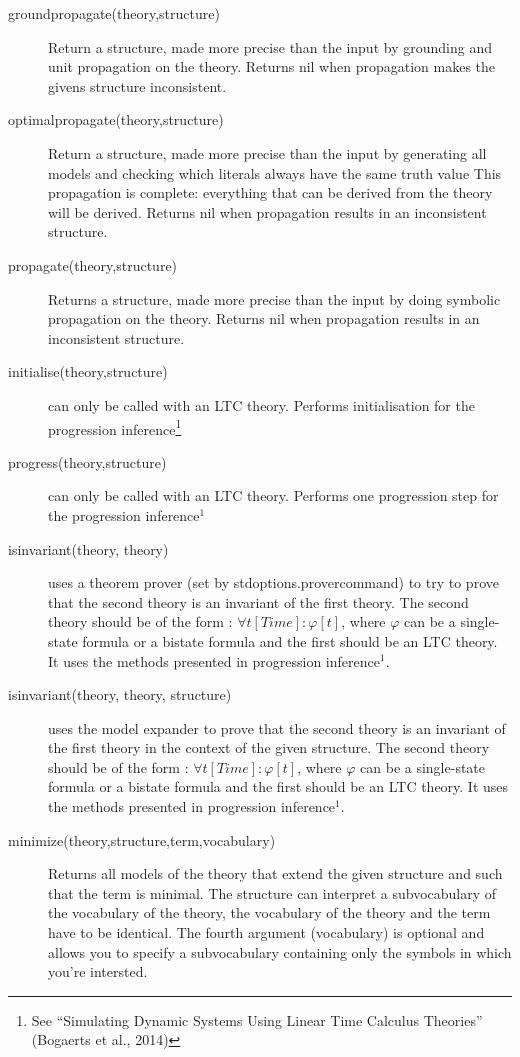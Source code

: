 \begin{description}
 	\item[groundpropagate(theory,structure)]
 		Return a structure, made more precise than the input by grounding and unit propagation on the theory.
		Returns nil when propagation makes the givens structure inconsistent.
	\item[optimalpropagate(theory,structure)]
 		Return a structure, made more precise than the input by generating all models and checking which literals always have the same truth value
 		This propagation is complete: everything that can be derived from the theory will be derived. 
 		Returns nil when propagation results in an inconsistent structure.
	\item[propagate(theory,structure)]
 		Returns a structure, made more precise than the input by doing symbolic propagation on the theory.
 		Returns nil when propagation results in an inconsistent structure.
 	\item[initialise(theory,structure)] can only be called with an LTC theory. Performs initialisation for the progression inference\footnote{See ``Simulating Dynamic Systems Using Linear Time Calculus Theories'' (Bogaerts et al., 2014)} 
 	\item[progress(theory,structure)] can only be called with an LTC theory. Performs one progression step for the progression inference$^1$ 
	\item[isinvariant(theory, theory)] uses a theorem prover (set by stdoptions.provercommand) to try to prove that the second theory is an invariant of the first theory. The second theory should be of the form : $\forall t[Time]:\varphi[t]$, where $\varphi$ can be a single-state formula or a bistate formula and the first should be an LTC theory. It uses the methods presented in progression inference$^1$.
	\item[isinvariant(theory, theory, structure)] uses the model expander to prove that the second theory is an invariant of the first theory in the context of the given structure. The second theory should be of the form : $\forall t[Time]:\varphi[t]$, where $\varphi$ can be a single-state formula or a bistate formula and the first should be an LTC theory. It uses the methods presented in progression inference$^1$.
	\item[minimize(theory,structure,term,vocabulary)] Returns all models of the theory that extend the given structure and such that the term is minimal. The structure can interpret a subvocabulary of the vocabulary of the theory, the vocabulary of the theory and the term have to be identical.
	The fourth argument (vocabulary) is optional and allows you to specify a subvocabulary containing only the symbols in which you're intersted.			

\end{description}
